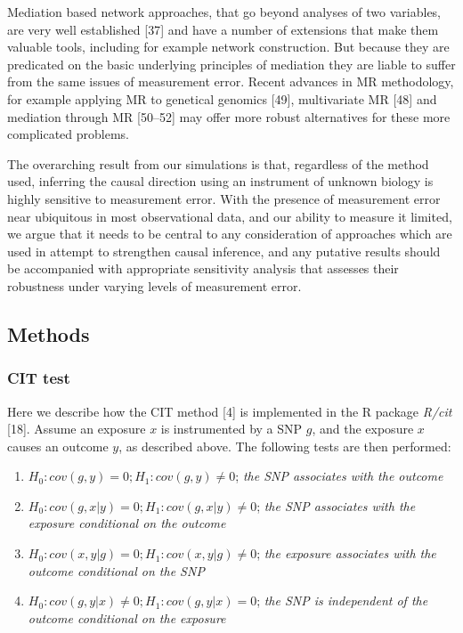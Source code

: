 \documentclass[]{article}
\providecommand{\tightlist}{%
  \setlength{\itemsep}{0pt}\setlength{\parskip}{0pt}}
\begin{document}
Mediation based network approaches, that go beyond analyses of two
variables, are very well established {[}37{]} and have a number of
extensions that make them valuable tools, including for example network
construction. But because they are predicated on the basic underlying
principles of mediation they are liable to suffer from the same issues
of measurement error. Recent advances in MR methodology, for example
applying MR to genetical genomics {[}49{]}, multivariate MR {[}48{]} and
mediation through MR {[}50--52{]} may offer more robust alternatives for
these more complicated problems.

The overarching result from our simulations is that, regardless of the
method used, inferring the causal direction using an instrument of
unknown biology is highly sensitive to measurement error. With the
presence of measurement error near ubiquitous in most observational
data, and our ability to measure it limited, we argue that it needs to
be central to any consideration of approaches which are used in attempt
to strengthen causal inference, and any putative results should be
accompanied with appropriate sensitivity analysis that assesses their
robustness under varying levels of measurement error.

\subsection{Methods}\label{methods}

\subsubsection{CIT test}\label{cit-test}

Here we describe how the CIT method {[}4{]} is implemented in the R
package \emph{R/cit} {[}18{]}. Assume an exposure \(x\) is instrumented
by a SNP \(g\), and the exposure \(x\) causes an outcome \(y\), as
described above. The following tests are then performed:

\begin{enumerate}
\def\labelenumi{\arabic{enumi}.}
\tightlist
\item
  \(H_0: cov(g, y) = 0; H_1: cov(g, y) \neq 0\); \emph{the SNP
  associates with the outcome}
\item
  \(H_0: cov(g, x|y) = 0; H_1: cov(g, x|y) \neq 0\); \emph{the SNP
  associates with the exposure conditional on the outcome}
\item
  \(H_0: cov(x, y|g) = 0; H_1: cov(x, y|g) \neq 0\); \emph{the exposure
  associates with the outcome conditional on the SNP}
\item
  \(H_0: cov(g, y|x) \neq 0; H_1: cov(g, y|x) = 0\); \emph{the SNP is
  independent of the outcome conditional on the exposure}
\end{enumerate}
\end{document}
